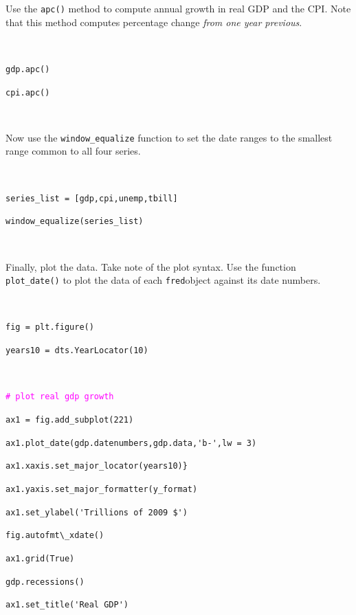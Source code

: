\documentclass[11pt,fleqn]{article}
\newcommand{\ttt}{\texttt}
\newcommand{\tc}{\textcolor}
\begin{document}
\noindent Use the \ttt{apc()} method to compute annual growth in real GDP and the CPI. Note that this method computes percentage change \emph{from one year previous}.

\

\begin{minipage}{6.5in}
\ttt{gdp.apc()}

\ttt{cpi.apc()}

\

\end{minipage}

\noindent Now use the \ttt{window\_equalize} function to set the date ranges to the smallest range common to all four series.

\

\begin{minipage}{6.5in}
\verb!series_list = [gdp,cpi,unemp,tbill]!

\verb!window_equalize(series_list)!

\

\end{minipage}

\noindent Finally, plot the data. Take note of the plot syntax. Use the function \verb!plot_date()! to plot the data of each \ttt{fred}object against its date numbers.

\

\begin{minipage}{6.5in}
\ttt{fig = plt.figure()}

\ttt{years10  = dts.YearLocator(10)}

\
\end{minipage}


\begin{minipage}{6.5in}
\ttt{\tc{Magenta}{\# plot real gdp growth}}

\verb!ax1 = fig.add_subplot(221)!

\verb!ax1.plot_date(gdp.datenumbers,gdp.data,'b-',lw = 3)!

\verb!ax1.xaxis.set_major_locator(years10)}!

\verb!ax1.yaxis.set_major_formatter(y_format)!

\verb!ax1.set_ylabel('Trillions of 2009 $')!

\verb!fig.autofmt\_xdate()!

\ttt{ax1.grid(True)}

\ttt{gdp.recessions()}

\verb!ax1.set_title('Real GDP')!

\

\end{minipage}
\end{document}
